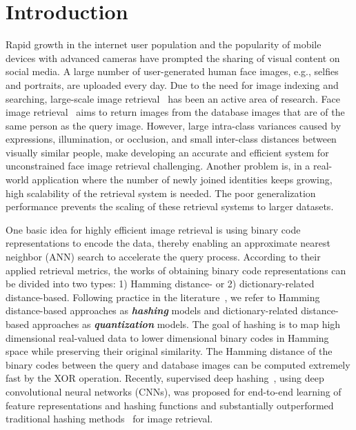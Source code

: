 \documentclass{elsarticle}
\begin{document}
\section{Introduction}
Rapid growth in the internet user population and the popularity of mobile devices with advanced cameras have prompted the sharing of visual content on social media. A large number of user-generated human face images, e.g., selfies and portraits, are uploaded every day. Due to the need for image indexing and searching, large-scale image retrieval~\cite{yu2014learning,zhao2022feature} has been an active area of research. Face image retrieval~\cite{tang2018discriminative, zaeemzadeh2021face, zhang2021deep} aims to return images from the database images that are of the same person as the query image. However, large intra-class variances caused by expressions, illumination, or occlusion, and small inter-class distances between visually similar people, make developing an accurate and efficient system for unconstrained face image retrieval challenging. Another problem is, in a real-world application where the number of newly joined identities keeps growing, high scalability of the retrieval system is needed. The poor generalization performance prevents the scaling of these retrieval systems to larger datasets.

One basic idea for highly efficient image retrieval is using binary code representations to encode the data, thereby enabling an approximate nearest neighbor (ANN) search to accelerate the query process. According to their applied retrieval metrics, the works of obtaining binary code representations can be divided into two types: 1) Hamming distance- or 2) dictionary-related distance-based. Following practice in the literature~\cite{klein2019end,jang2020generalized,yu2020product}, we refer to Hamming distance-based approaches as \textbf{\textit{hashing}} models and dictionary-related distance-based approaches as \textbf{\textit{quantization}} models. The goal of hashing is to map high dimensional real-valued data to lower dimensional binary codes in Hamming space while preserving their original similarity. The Hamming distance of the binary codes between the query and database images can be computed extremely fast by the XOR operation. %
Recently, supervised deep hashing~\cite{li2016feature,lin2017discriminative,Yuan_2020_CVPR}, using deep convolutional neural networks (CNNs), was proposed for end-to-end learning of feature representations and hashing functions and substantially outperformed traditional hashing methods~\cite{song2018quantization} for image retrieval. 
\end{document}
